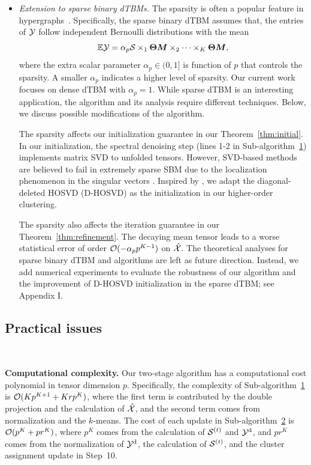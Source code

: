 \documentclass[journal]{IEEEtran}
\theoremstyle{definition}
\theoremstyle{definition}
\begin{document}
\begin{itemize}[wide]
\item \textit{Extension to sparse binary dTBMs.} The sparsity is often a popular feature in hypergraphs~\citep{florescu2016spectral,ke2019community, ahn2018hypergraph}. Specifically, the sparse binary dTBM assumes that, the entries of $\mathcal{Y}$ follow independent Bernoulli distributions with the mean
     \begin{equation}\label{eq:sparse_dtbm}
    \bbE\tY = \alpha_p \tS \times_1 \mTheta \mM \times_2  \cdots \times_K \mTheta \mM,
\end{equation}
where the extra scalar parameter $\alpha_p \in (0,1]$ is function of $p$ that controls the sparsity. A smaller $\alpha_p$ indicates a higher level of sparsity. Our current work focuses on dense dTBM with $\alpha_p=1$.  While sparse dTBM is an interesting application, the algorithm and its analysis require different techniques. Below, we discuss possible modifications of the algorithm.

The sparsity affects our initialization guarantee in our Theorem~\ref{thm:initial}. In our initialization, the spectral denoising step (lines 1-2 in Sub-algorithm~\hyperref[alg:main]{1}) implements matrix SVD to unfolded tensors. %
However, SVD-based methods are believed to fail in extremely sparse SBM due to the localization phenomenon in the singular vectors \citep{florescu2016spectral}. Inspired by \cite{florescu2016spectral}, we adapt the diagonal-deleted HOSVD (D-HOSVD) \citep{ke2019community} as the initialization in our higher-order clustering. 

The sparsity also affects the iteration guarantee in our Theorem~\ref{thm:refinement}. The decaying mean tensor leads to a worse statistical error of order $\mathcal{O}( -\alpha_p p^{K-1})$ on $\hat {\mathcal{X}}$. The theoretical analyses for sparse binary dTBM and algorithms are left as future direction. Instead, we add numerical experiments to evaluate the robustness of our algorithm and the improvement of D-HOSVD initialization in the sparse dTBM; see Appendix I.

\end{itemize}

\subsection{Practical issues}~\label{subsec:exten}

{\bf Computational complexity.} Our two-stage algorithm has a computational cost polynomial in tensor dimension $p$. Specifically, the complexity of Sub-algorithm~\hyperref[alg:main]{1} is $\mathcal{O}(K p^{K+1} + Krp^K)$, where the first term is contributed by the double projection and the calculation of $\hat {\mathcal{X}}$, and the second term comes from normalization and the $k$-means. The cost of each update in Sub-algorithm~\hyperref[alg:main]{2} is $\mathcal{O}(p^K + pr^K)$, where $p^K$ comes from the calculation of $\mathcal{S}^{(t)}$ and $\mathcal{Y}^{\text{d}}$, and $pr^K$ comes from the normalization of $\mathcal{Y}^{\text{d}}$, the calculation of $\mathcal{S}^{(t)}$, and the cluster assignment update in Step~10.
\end{document}
